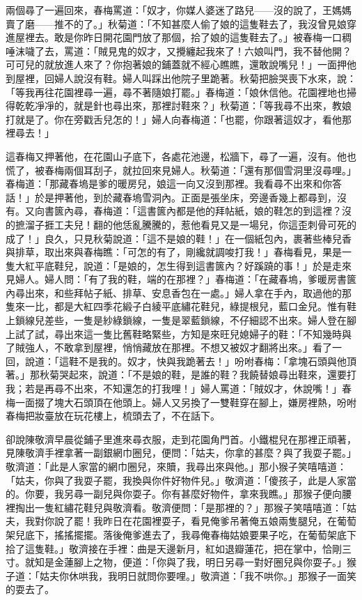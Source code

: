 兩個尋了一遍回來，春梅罵道：「奴才，你媒人婆迷了路兒——沒的說了，王媽媽賣了磨——推不的了。」秋菊道：「不知甚麼人偷了娘的這隻鞋去了，我沒曾見娘穿進屋裡去。敢是你昨日開花園門放了那個，拾了娘的這隻鞋去了。」被春梅一口稠唾沫噦了去，罵道：「賊見鬼的奴才，又攪纏起我來了！六娘叫門，我不替他開？可可兒的就放進人來了？你抱著娘的鋪蓋就不經心瞧瞧，還敢說嘴兒！」一面押他到屋裡，回婦人說沒有鞋。婦人叫踩出他院子里跪著。秋菊把臉哭喪下水來，說：「等我再往花園裡尋一遍，尋不著隨娘打罷。」春梅道：「娘休信他。花園裡地也掃得乾乾凈凈的，就是針也尋出來，那裡討鞋來？」秋菊道：「等我尋不出來，教娘打就是了。你在旁戳舌兒怎的！」婦人向春梅道：「也罷，你跟著這奴才，看他那裡尋去！」

這春梅又押著他，在花園山子底下，各處花池邊，松牆下，尋了一遍，沒有。他也慌了，被春梅兩個耳刮子，就拉回來見婦人。秋菊道：「還有那個雪洞里沒尋哩。」春梅道：「那藏春塢是爹的暖房兒，娘這一向又沒到那裡。我看尋不出來和你答話！」於是押著他，到於藏春塢雪洞內。正面是張坐床，旁邊香幾上都尋到，沒有。又向書篋內尋，春梅道：「這書篋內都是他的拜帖紙，娘的鞋怎的到這裡？沒的摭溜子捱工夫兒！翻的他恁亂騰騰的，惹他看見又是一場兒，你這歪刺骨可死的成了！」良久，只見秋菊說道：「這不是娘的鞋！」在一個紙包內，裹著些棒兒香與排草，取出來與春梅瞧：「可怎的有了，剛纔就調唆打我！」春梅看見，果是一隻大紅平底鞋兒，說道：「是娘的，怎生得到這書篋內？好蹊蹺的事！」於是走來見婦人。婦人問：「有了我的鞋，端的在那裡？」春梅道：「在藏春塢，爹暖房書篋內尋出來，和些拜帖子紙、排草、安息香包在一處。」婦人拿在手內，取過他的那隻來一比，都是大紅四季花緞子白綾平底繡花鞋兒，綠提根兒，藍口金兒。惟有鞋上鎖線兒差些，一隻是紗綠鎖線，一隻是翠藍鎖線，不仔細認不出來。婦人登在腳上試了試，尋出來這一隻比舊鞋略緊些，方知是來旺兒媳婦子的鞋：「不知幾時與了賊強人，不敢拿到屋裡，悄悄藏放在那裡。不想又被奴才翻將出來。」看了一回，說道：「這鞋不是我的。奴才，快與我跪著去！」吩咐春梅：「拿塊石頭與他頂著。」那秋菊哭起來，說道：「不是娘的鞋，是誰的鞋？我饒替娘尋出鞋來，還要打我；若是再尋不出來，不知還怎的打我哩！」婦人罵道：「賊奴才，休說嘴！」春梅一面掇了塊大石頭頂在他頭上。婦人又另換了一雙鞋穿在腳上，嫌房裡熱，吩咐春梅把妝臺放在玩花樓上，梳頭去了，不在話下。

卻說陳敬濟早晨從鋪子里進來尋衣服，走到花園角門首。小鐵棍兒在那裡正頑著，見陳敬濟手裡拿著一副銀網巾圈兒，便問：「姑夫，你拿的甚麼？與了我耍子罷。」敬濟道：「此是人家當的網巾圈兒，來贖，我尋出來與他。」那小猴子笑嘻嘻道：「姑夫，你與了我耍子罷，我換與你件好物件兒。」敬濟道：「傻孩子，此是人家當的。你要，我另尋一副兒與你耍子。你有甚麼好物件，拿來我瞧。」那猴子便向腰裡掏出一隻紅繡花鞋兒與敬濟看。敬濟便問：「是那裡的？」那猴子笑嘻嘻道：「姑夫，我對你說了罷！我昨日在花園裡耍子，看見俺爹吊著俺五娘兩隻腿兒，在葡萄架兒底下，搖搖擺擺。落後俺爹進去了，我尋俺春梅姑娘要果子吃，在葡萄架底下拾了這隻鞋。」敬濟接在手裡：曲是天邊新月，紅如退瓣蓮花，把在掌中，恰剛三寸。就知是金蓮腳上之物，便道：「你與了我，明日另尋一對好圈兒與你耍子。」猴子道：「姑夫你休哄我，我明日就問你要哩。」敬濟道：「我不哄你。」那猴子一面笑的耍去了。

